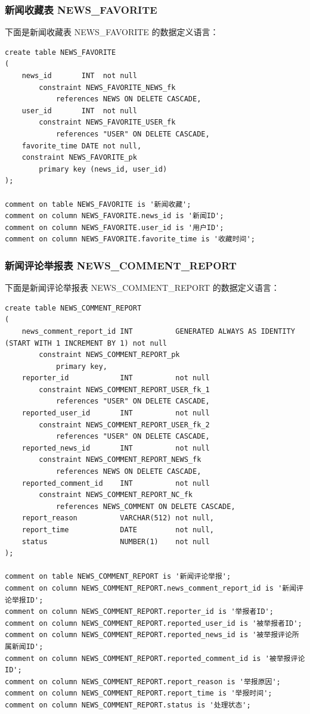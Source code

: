 \subsubsection{新闻收藏表 NEWS\_FAVORITE}

下面是新闻收藏表 NEWS\_FAVORITE 的数据定义语言：

\begin{verbatim}
create table NEWS_FAVORITE
(
    news_id       INT  not null
        constraint NEWS_FAVORITE_NEWS_fk
            references NEWS ON DELETE CASCADE,
    user_id       INT  not null
        constraint NEWS_FAVORITE_USER_fk
            references "USER" ON DELETE CASCADE,
    favorite_time DATE not null,
    constraint NEWS_FAVORITE_pk
        primary key (news_id, user_id)
);

comment on table NEWS_FAVORITE is '新闻收藏';
comment on column NEWS_FAVORITE.news_id is '新闻ID';
comment on column NEWS_FAVORITE.user_id is '用户ID';
comment on column NEWS_FAVORITE.favorite_time is '收藏时间';
\end{verbatim}

\subsubsection{新闻评论举报表 NEWS\_COMMENT\_REPORT}

下面是新闻评论举报表 NEWS\_COMMENT\_REPORT 的数据定义语言：

\begin{verbatim}
create table NEWS_COMMENT_REPORT
(
    news_comment_report_id INT          GENERATED ALWAYS AS IDENTITY (START WITH 1 INCREMENT BY 1) not null
        constraint NEWS_COMMENT_REPORT_pk
            primary key,
    reporter_id            INT          not null
        constraint NEWS_COMMENT_REPORT_USER_fk_1
            references "USER" ON DELETE CASCADE,
    reported_user_id       INT          not null
        constraint NEWS_COMMENT_REPORT_USER_fk_2
            references "USER" ON DELETE CASCADE,
    reported_news_id       INT          not null
        constraint NEWS_COMMENT_REPORT_NEWS_fk
            references NEWS ON DELETE CASCADE,
    reported_comment_id    INT          not null
        constraint NEWS_COMMENT_REPORT_NC_fk
            references NEWS_COMMENT ON DELETE CASCADE,
    report_reason          VARCHAR(512) not null,
    report_time            DATE         not null,
    status                 NUMBER(1)    not null
);

comment on table NEWS_COMMENT_REPORT is '新闻评论举报';
comment on column NEWS_COMMENT_REPORT.news_comment_report_id is '新闻评论举报ID';
comment on column NEWS_COMMENT_REPORT.reporter_id is '举报者ID';
comment on column NEWS_COMMENT_REPORT.reported_user_id is '被举报者ID';
comment on column NEWS_COMMENT_REPORT.reported_news_id is '被举报评论所属新闻ID';
comment on column NEWS_COMMENT_REPORT.reported_comment_id is '被举报评论ID';
comment on column NEWS_COMMENT_REPORT.report_reason is '举报原因';
comment on column NEWS_COMMENT_REPORT.report_time is '举报时间';
comment on column NEWS_COMMENT_REPORT.status is '处理状态';
\end{verbatim}

